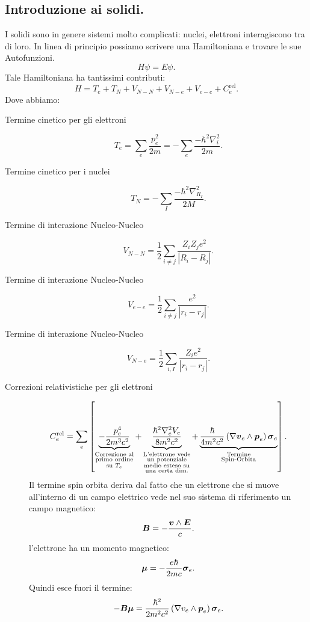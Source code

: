 \subsection{Introduzione ai solidi.}
\label{subsec:Solidi}
I solidi sono in genere sistemi molto complicati: nuclei, elettroni interagiscono tra di loro. In linea di principio possiamo scrivere una Hamiltoniana e trovare le sue Autofunzioni.
\[
	H \psi = E \psi
.\] 
Tale Hamiltoniana ha tantissimi contributi:
\[
	H = T_e + T_N + V_{N-N} + V_{N-e} + V_{e-e} + C_e^{\text{rel}}
.\] 
Dove abbiamo:
\begin{description}
	\item[Termine cinetico per gli elettroni] 
		 \[
			T_e = \sum_{e}^{} \frac{p_e^2}{2m} 
			= -\sum_{e}^{} \frac{-\hbar ^2 \nabla_i^2}{2m}
		.\] 

	\item[Termine cinetico per i nuclei] 
		\[
			T_N 
			=
			-\sum_{I}^{} \frac{-\hbar ^2 \nabla_{R_I}^2}{2M}
		.\] 
	\item[Termine di interazione Nucleo-Nucleo]
		\[
			V_{N-N} = 
			\frac{1}{2}\sum_{i\neq j}^{} 
			\frac{Z_iZ_je^2}{\left| R_i - R_j \right| }
		.\]  
	\item[Termine di interazione Nucleo-Nucleo]
		\[
			V_{e-e} = 
			\frac{1}{2}\sum_{i\neq j}^{} 
			\frac{e^2}{\left| r_i - r_j \right| }
		.\]
	\item[Termine di interazione Nucleo-Nucleo]
		\[
			V_{N-e} = 
			\frac{1}{2}\sum_{i,I}^{} 
			\frac{Z_ie^2}{\left| r_i - r_j \right| }
		.\]
	\item[Correzioni relativistiche per gli elettroni]
		\[
			C_e^{\text{rel}} 
			=
			\sum_{e}^{} \left[ \underbrace{-\frac{p_e^4}{2m^3c^2}}_
			{\substack{\text{Correzione al}\\ 
			\text{primo ordine}\\ 
			\text{su $T_e$}}}
			+ 
			\underbrace{\frac{\hbar ^2 \nabla_e^2 V_e}{8m^2c^2}}_
			{\substack{\text{L'elettrone vede}\\
			\text{un potenziale}\\
			\text{medio esteso su}\\
			\text{una certa dim.}}}
			+
			\underbrace{\frac{\hbar }{4m^2c^2}
			\left( \nabla \boldsymbol{v}_e \wedge\boldsymbol{p}_e\right) 
			\boldsymbol{\sigma}_e}_
			{\substack{\text{Termine}\\
			\text{Spin-Orbita}}}
			\right] 
		.\] 
		Il termine spin orbita deriva dal fatto che un elettrone che si muove
		all'interno di un campo elettrico vede nel suo sistema di riferimento
		un campo magnetico:
		\[
			\boldsymbol{B} = -\frac{\boldsymbol{v}\wedge \boldsymbol{E}}{c}
		.\] 
		l'elettrone ha un momento magnetico:
		\[
			\boldsymbol{\mu} = - \frac{e\hbar }{2mc} \boldsymbol{\sigma}_e
		.\] 
		Quindi esce fuori il termine:
		\[
			-\boldsymbol{B}\boldsymbol{\mu} 
			=
			\frac{\hbar ^2}{2m^2c^2}\left( \nabla v_e \wedge \boldsymbol{p}_e \right)
			\boldsymbol{\sigma}_e
		.\] 
\end{description}

